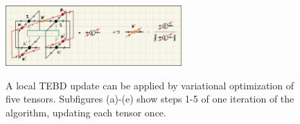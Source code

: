 \begin{figure}
{	}
	\subcaptionbox{\label{fig:disoTPS_TEBD_local_update_W2}}
	{%
		\includegraphics[width=0.6\textwidth]{figures/disoTPS/disoTPS_TEBD_local_update_W.jpeg}
	}
	\caption{A local TEBD update can be applied by variational optimization of five tensors. Subfigures (a)-(e) show steps 1-5 of one iteration of the algorithm, updating each tensor once.}
	\label{fig:disoTPS_TEBD_local_update_detailed}
\end{figure}

